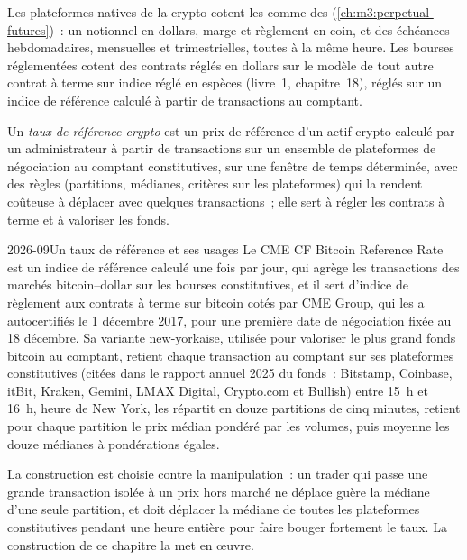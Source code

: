 Les plateformes natives de la crypto cotent les  comme des  (\cref{ch:m3:perpetual-futures})~: un notionnel
en dollars, marge et règlement en coin, et des échéances hebdomadaires, mensuelles et trimestrielles, toutes à la même heure.
Les bourses réglementées cotent des contrats réglés en dollars sur le modèle de tout autre contrat à terme sur indice réglé en espèces (livre~1,
chapitre~18), réglés sur un indice de référence calculé à partir de transactions au comptant.

\begin{definition}\label{def:m3:dated-futures-options-and-etfs:rate}
Un \emph{taux de référence crypto} est un prix de référence d'un actif crypto calculé par un
administrateur à partir de transactions sur un ensemble de plateformes de négociation au comptant constitutives, sur une fenêtre de temps déterminée, avec des règles (partitions,
médianes, critères sur les plateformes) qui la rendent coûteuse à déplacer avec quelques transactions~; elle sert à régler les contrats à terme et à valoriser les
fonds.
\end{definition}

\begin{dated}{2026-09}{Un taux de référence et ses usages}\label{dat:m3:dated-futures-options-and-etfs:brr}
Le CME CF Bitcoin Reference Rate est un indice de référence calculé une fois par jour, qui agrège les transactions des marchés bitcoin--dollar sur
les bourses constitutives, et il sert d'indice de règlement aux contrats à terme sur bitcoin cotés par CME Group, qui les a autocertifiés le
1 décembre 2017, pour une première date de négociation fixée au 18 décembre. Sa variante new-yorkaise,
utilisée pour valoriser le plus grand fonds bitcoin au comptant, retient chaque transaction au comptant sur ses plateformes constitutives (citées dans le
rapport annuel 2025 du fonds~: Bitstamp, Coinbase, itBit, Kraken, Gemini, LMAX Digital, Crypto.com et Bullish)
entre 15~h et 16~h, heure de New York, les répartit en douze partitions de cinq minutes, retient pour chaque partition le
prix médian pondéré par les volumes, puis moyenne les douze médianes à pondérations égales.
\end{dated}

La construction est choisie contre la manipulation~: un trader qui passe une grande transaction isolée à un prix hors marché ne
déplace guère la médiane d'une seule partition, et doit déplacer la médiane de toutes les plateformes constitutives pendant une heure entière pour
faire bouger fortement le taux. La construction de ce chapitre la met en œuvre.

